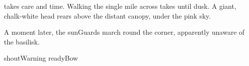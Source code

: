 takes care and time.
Walking the single mile across takes until dusk.
A giant, chalk-white head rears above the distant canopy, under the pink sky.

A moment later, the \glspl{sunGuard} march round the corner, apparently unaware of the \gls{basilisk}.

\begin{selectPath}
  {}%
  {shoutWarning}
  {}%
  {readyBow}
\end{selectPath}
